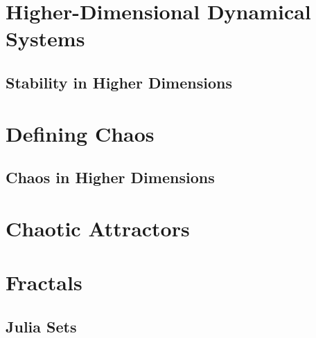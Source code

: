 \documentclass[11pt,a4paper,oneside]{memoir}
\theoremstyle{plain}
\theoremstyle{definition}
\begin{document}
\chapter{Higher-Dimensional Dynamical Systems}
\section{Stability in Higher Dimensions}

\chapter{Defining Chaos}
\section{Chaos in Higher Dimensions}
\chapter{Chaotic Attractors}

\chapter{Fractals}
\section{Julia Sets}


\end{document}
